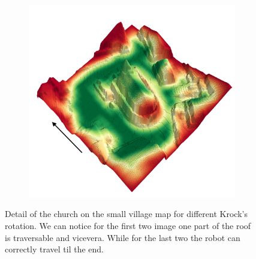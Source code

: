\documentclass[../document.tex]{subfiles}
\begin{document}
\begin{figure}[H]
\begin{subfigure}[b]{0.45\textwidth}
    \end{subfigure}
    \begin{subfigure}[b]{0.45\textwidth}
        \includegraphics[width=\linewidth]{../img/4/traversability/sullens-church/-180.png}  
    \end{subfigure}
    \caption{Detail of the church on the small village map for different Krock's rotation. We can notice for the first two image one part of the roof is traversable and vicevera. While for the last two the robot can correctly travel til the end.}
    \end{figure}
\end{document}
